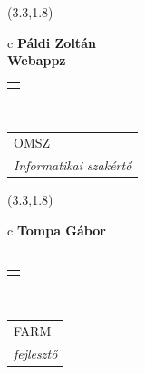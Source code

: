 \documentclass[11pt]{article}
\begin{document}
\makebox(3.3,1.8){
  \renewcommand\arraystretch{1.3}
  \begin{tabular}[c]{c}
    \hspace{8.5mm}
    \LARGE\bf{ Páldi Zoltán }\\
    \hspace{8.5mm}
    \Large{ Webappz }\\
    \renewcommand\arraystretch{3}
    \begin{tabular}[c]{c}
      \centering
      \fontfamily{phv}\selectfont{
        \textbf{
          \textsc{
            \scriptsize{
            \color{Bright}{ Ismerkedő }\color{Dark}{ Webmester }\color{Bright}{ Sminkmester }\color{Dark}{ Programozó }
            }
          }
        }
      }
    \end{tabular}
    \\
    \renewcommand\arraystretch{1}
    \begin{tabular}{p{3.3in}}
      \hspace{.7cm}OMSZ\\
      \hspace{.7cm}\emph{ Informatikai szakértő }\\
    \end{tabular}
  \end{tabular}
}

\makebox(3.3,1.8){
  \renewcommand\arraystretch{1.3}
  \begin{tabular}[c]{c}
    \hspace{8.5mm}
    \LARGE\bf{ Tompa Gábor }\\
    \hspace{8.5mm}
    \Large{  }\\
    \renewcommand\arraystretch{3}
    \begin{tabular}[c]{c}
      \centering
      \fontfamily{phv}\selectfont{
        \textbf{
          \textsc{
            \scriptsize{
            \color{Dark}{ Ismerkedő }\color{Dark}{ Webmester }\color{Dark}{ Sminkmester }\color{Dark}{ Programozó }
            }
          }
        }
      }
    \end{tabular}
    \\
    \renewcommand\arraystretch{1}
    \begin{tabular}{p{3.3in}}
      \hspace{.7cm}FARM\\
      \hspace{.7cm}\emph{ fejlesztő }\\
    \end{tabular}
  \end{tabular}
}
\end{document}

